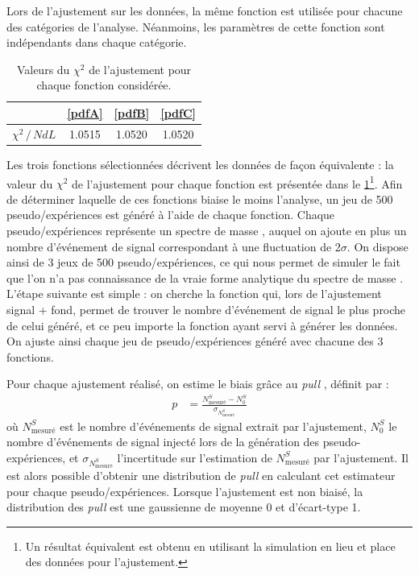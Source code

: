 Lors de l'ajustement sur les données, la même fonction est utilisée pour chacune des catégories de l'analyse. Néanmoins, les paramètres de cette fonction sont indépendants dans chaque catégorie.

\begin{table} \centering
\begin{tabular}{@{}cccc@{}} \toprule
 & \ref{pdfA} & \ref{pdfB} & \ref{pdfC} \\ \midrule
 $\chi^2 \, / \, NdL$ & \num{1.0515} & \num{1.0520} & \num{1.0520} \\
 \bottomrule
\end{tabular}
\caption{Valeurs du $\chi^2$ de l'ajustement pour chaque fonction considérée.}
\label{tab:chi2}
\end{table}

Les trois fonctions sélectionnées décrivent les données de façon équivalente : la valeur du $\chi^2$ de l'ajustement pour chaque fonction est présentée dans le \cref{tab:chi2}\footnote{Un résultat équivalent est obtenu en utilisant la simulation en lieu et place des données pour l'ajustement.}. Afin de déterminer laquelle de ces fonctions biaise le moins l'analyse, un jeu de 500 pseudo\-/expériences est généré à l'aide de chaque fonction. Chaque pseudo\-/expériences représente un spectre de masse \ttbar, auquel on ajoute en plus un nombre d'événement de signal correspondant à une fluctuation de 2$\sigma$. On dispose ainsi de 3 jeux de 500 pseudo\-/expériences, ce qui nous permet de simuler le fait que l'on n'a pas connaissance de la vraie forme analytique du spectre de masse \ttbar. L'étape suivante est simple : on cherche la fonction qui, lors de l'ajustement signal + fond, permet de trouver le nombre d'événement de signal le plus proche de celui généré, et ce peu importe la fonction ayant servi à générer les données. On ajuste ainsi chaque jeu de pseudo\-/expériences généré avec chacune des 3 fonctions.

Pour chaque ajustement réalisé, on estime le biais grâce au \emph{pull} \citep{pulls}, définit par :
\begin{align*}
  p &= \frac{N^S_\text{mesuré} - N^S_{0}}{\sigma_{N^S_\text{mesuré}}}
\end{align*}
où $N^S_\text{mesuré}$ est le nombre d'événements de signal extrait par l'ajustement, $N^S_{0}$ le nombre d'événements de signal injecté lors de la génération des pseudo-expérien\-ces, et $\sigma_{N^S_\text{mesuré}}$ l'incertitude sur l'estimation de $N^S_\text{mesuré}$ par l'ajustement. Il est alors possible d'obtenir une distribution de \emph{pull} en calculant cet estimateur pour chaque pseudo\-/expériences. Lorsque l'ajustement est non biaisé, la distribution des \emph{pull} est une gaussienne de moyenne 0 et d'écart-type 1.

